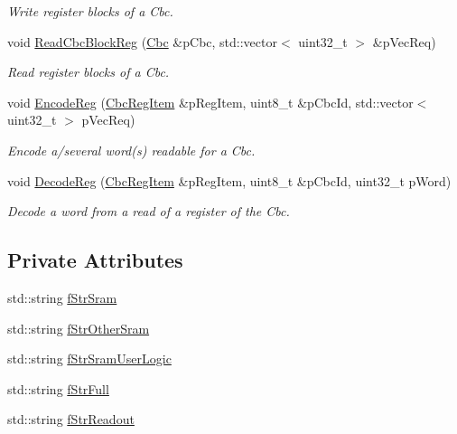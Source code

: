 \begin{DoxyCompactItemize}
\begin{DoxyCompactList}\small\item\em Write register blocks of a Cbc. \end{DoxyCompactList}\item 
void \hyperlink{class_ph2___hw_interface_1_1_cbc_interface_a42ab8453dafd3f2d3c079536efde0569}{Read\-Cbc\-Block\-Reg} (\hyperlink{class_ph2___hw_description_1_1_cbc}{Cbc} \&p\-Cbc, std\-::vector$<$ uint32\-\_\-t $>$ \&p\-Vec\-Req)
\begin{DoxyCompactList}\small\item\em Read register blocks of a Cbc. \end{DoxyCompactList}\item 
void \hyperlink{class_ph2___hw_interface_1_1_cbc_interface_afa604881734cbe66e08b357cef693245}{Encode\-Reg} (\hyperlink{struct_ph2___hw_description_1_1_cbc_reg_item}{Cbc\-Reg\-Item} \&p\-Reg\-Item, uint8\-\_\-t \&p\-Cbc\-Id, std\-::vector$<$ uint32\-\_\-t $>$ p\-Vec\-Req)
\begin{DoxyCompactList}\small\item\em Encode a/several word(s) readable for a Cbc. \end{DoxyCompactList}\item 
void \hyperlink{class_ph2___hw_interface_1_1_cbc_interface_acf2c23c04d1f48b3d1ad875d63e6b98e}{Decode\-Reg} (\hyperlink{struct_ph2___hw_description_1_1_cbc_reg_item}{Cbc\-Reg\-Item} \&p\-Reg\-Item, uint8\-\_\-t \&p\-Cbc\-Id, uint32\-\_\-t p\-Word)
\begin{DoxyCompactList}\small\item\em Decode a word from a read of a register of the Cbc. \end{DoxyCompactList}\end{DoxyCompactItemize}
\subsection*{Private Attributes}
\begin{DoxyCompactItemize}
\item 
std\-::string \hyperlink{class_ph2___hw_interface_1_1_cbc_interface_aaddc36b6ef3360c0a99da44c53a3242f}{f\-Str\-Sram}
\item 
std\-::string \hyperlink{class_ph2___hw_interface_1_1_cbc_interface_a3277ad84e5806e7992563dbb6122fdb9}{f\-Str\-Other\-Sram}
\item 
std\-::string \hyperlink{class_ph2___hw_interface_1_1_cbc_interface_a61c9447688cc556e33d7051c26459755}{f\-Str\-Sram\-User\-Logic}
\item 
std\-::string \hyperlink{class_ph2___hw_interface_1_1_cbc_interface_a72fbeb3befe9e533fc21cc568e540df4}{f\-Str\-Full}
\item 
std\-::string \hyperlink{class_ph2___hw_interface_1_1_cbc_interface_ade4f2642613500ee5f1963c22509c48b}{f\-Str\-Readout}
\end{DoxyCompactItemize}
